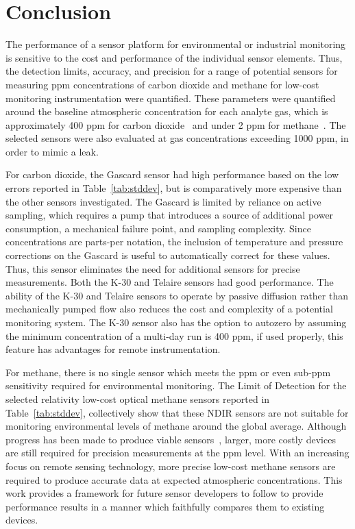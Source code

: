 \documentclass[preprint,sort&compress]{elsarticle}
\begin{document}
			
			\FloatBarrier	
	
	\section{Conclusion}
	
		The performance of a sensor platform for environmental or industrial monitoring is sensitive to the cost and performance of the individual sensor elements.
			Thus, the detection limits, accuracy, and precision for a range of potential sensors for measuring ppm concentrations of carbon dioxide and methane for low-cost monitoring instrumentation were quantified.
			These parameters were quantified around the baseline atmospheric concentration for each analyte gas, which is approximately 400 ppm for carbon dioxide~\cite{blasing_recent_2016,dlugokencky_trends_2016} and under 2 ppm for methane~\cite{turner_large_2016,bamberger_spatial_2014,dlugokencky_trends_2016-1}.
			The selected sensors were also evaluated at gas concentrations exceeding 1000 ppm, in order to mimic a leak.
			
		
		For carbon dioxide, the Gascard sensor had high performance based on the low errors reported in Table~\ref{tab:stddev}, but is comparatively more expensive than the other sensors investigated.
		The Gascard is limited by reliance on active sampling, which requires a pump that introduces a source of additional power consumption, a mechanical failure point, and sampling complexity.
		Since concentrations are parts-per notation, the inclusion of temperature and pressure corrections on the Gascard is useful to automatically correct for these values.
		Thus, this sensor eliminates the need for additional sensors for precise measurements.
		 Both the K-30 and Telaire sensors had good performance.
		The ability of the K-30 and Telaire sensors to operate by passive diffusion rather than mechanically pumped flow also reduces the cost and complexity of a potential monitoring system.
		 The K-30 sensor also has the option to autozero by assuming the minimum concentration of a multi-day run is 400 ppm, if used properly, this feature has advantages for remote instrumentation.
		
		
		For methane, there is no single sensor which meets the ppm or even sub-ppm sensitivity required for environmental monitoring. The Limit of Detection for the selected relativity low-cost optical methane sensors reported in Table~\ref{tab:stddev}, collectively show that these NDIR sensors are not suitable for monitoring environmental levels of methane around the global average.
		Although progress has been made to produce viable sensors~\cite{zhu_one_2012}, larger, more costly devices are still required for precision measurements at the ppm level.
		With an increasing focus on remote sensing technology, more precise low-cost methane sensors are required to produce accurate data at expected atmospheric concentrations.
		This work provides a framework for future sensor developers to follow to provide performance results in a manner which faithfully compares them to existing devices.
		
\end{document}
